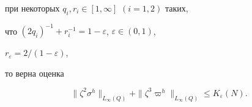 \begin{thms}
при некоторых $q_i,r_i\in [1,\infty]$ $(i=1,2)$ таких,


что $(2q_i)^{-1}+r_i^{-1}=1-\varepsilon$, $\varepsilon\in (0,1)$,


$r_{\varepsilon}=2/(1-\varepsilon)$,


то верна оценка


\begin{equation}


\|\zeta^2\sigma^h\|_{L_\infty(Q)}+\|\zeta^3\varpi^h\|_{L_\infty(Q)}


\le K_{\varepsilon}(N).


\end{equation}


\end{thms}





